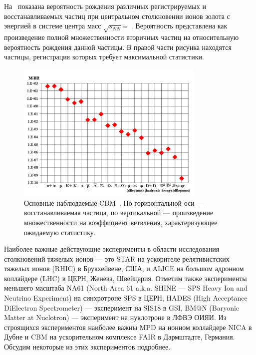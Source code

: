 На~ показана вероятность рождения различных регистрируемых и восстанавливаемых частиц при центральном столкновении ионов золота с энергией в системе центра масс $\sqrt{s_{NN}}$=\todo~\GeVperNucl{}. Вероятность представлена как произведение полной множественности вторичных частиц на относительную вероятность рождения данной частицы. В правой части рисунка находятся частицы, регистрация которых требует максимальной статистики.

\begin{figure}[H]
\includegraphics[width=0.8\textwidth]{pictures/CBM_observables.png}
\caption{Основные наблюдаемые CBM~\cite{CBMBook}. По горизонтальной оси --- восстанавливаемая частица, по вертикальной --- произведение множественности на коэффициент ветвления, характеризующее ожидаемую статистику.}
\label{fig:CBMParticlesYields}
\end{figure}



Наиболее важные действующие эксперименты в области исследования столкновений тяжелых ионов --- это STAR на ускорителе релятивистских тяжелых ионов (RHIC) в Брукхейвене, США, и ALICE на большом адронном коллайдере (LHC) в ЦЕРН, Женева, Швейцария. Отметим также эксперименты меньшего масштаба NA61 (North Area 61 a.k.a. SHINE --- SPS Heavy Ion and Neutrino Experiment) на синхротроне SPS в ЦЕРН, HADES (High Acceptance DiElectron Spectrometer) --- эксперимент на SIS18 в GSI, BM$@$N (Baryonic Matter at Nuclotron) --- эксперимент на нуклотроне в ЛФВЭ ОИЯИ. Из строящихся экспериментов наиболее важны MPD на ионном коллайдере NICA в Дубне и CBM на ускорительном комплексе FAIR в Дармштадте, Германия. Обсудим некоторые из этих экспериментов подробнее.

